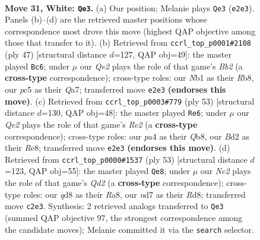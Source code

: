 \documentclass[11pt]{article}
\begin{document}
\clearpage

\begin{figure}[p]\centering
\begin{subfigure}{0.46\textwidth}\centering
\resizebox{\linewidth}{!}{%
\newchessgame
\chessboard[
  setfen={r2q1rk1/3n1pb1/3p1n2/1Ppb3p/p6P/P2B2P1/1PNBQ3/RN3RK1 w - c6 0 31},
  showmover=false,
  pgfstyle=straightmove, color=movearrow, markmove={e2-e3}
]}
\caption{}
\end{subfigure}\hfill
\begin{subfigure}{0.46\textwidth}\centering
\resizebox{\linewidth}{!}{%
\newchessgame
\chessboard[
  setfen={1rr2k1b/qb2pp1p/p5pP/4n3/8/1NN2P2/PPP1B1P1/1K1RQ2R b - - 8 24},
  showmover=false,
  pgfstyle=straightmove, color=movearrow, markmove={b7-c6}
]}
\caption{}
\end{subfigure}
\\[4pt]
\begin{subfigure}{0.46\textwidth}\centering
\resizebox{\linewidth}{!}{%
\newchessgame
\chessboard[
  setfen={1q2rbk1/1b1nrpp1/3p3p/1Pp5/4Pn2/2B2N1P/2QN1PP1/1R2RBK1 b - - 6 27},
  showmover=false,
  pgfstyle=straightmove, color=movearrow, markmove={e7-e6}
]}
\caption{}
\end{subfigure}\hfill
\begin{subfigure}{0.46\textwidth}\centering
\resizebox{\linewidth}{!}{%
\newchessgame
\chessboard[
  setfen={r2r2k1/3q1nb1/2p1bnp1/2B1p2p/p3P3/P1N3NP/2P1B1P1/1R2QRK1 b - - 9 27},
  showmover=false,
  pgfstyle=straightmove, color=movearrow, markmove={d7-e8}
]}
\caption{}
\end{subfigure}
\caption{\textbf{Move 31, White: \texttt{Qe3}.} (a) Our position; Melanie plays \texttt{Qe3} (\texttt{e2e3}). Panels (b)--(d) are the retrieved master positions whose correspondence most drove this move (highest QAP objective among those that transfer to it). (b) Retrieved from \texttt{ccrl\_top\_p0001\#2108} (ply 47) [structural distance $d$=127, QAP obj=49]: the master played \texttt{Bc6}; under $\mu$ our \emph{Qe2} plays the role of that game's \emph{Bb2} (a \textbf{cross-type} correspondence); cross-type roles: our \emph{N}b1 as their \emph{R}b8, our \emph{p}c5 as their \emph{Q}a7; transferred move \texttt{e2e3} \textbf{(endorses this move)}. (c) Retrieved from \texttt{ccrl\_top\_p0003\#779} (ply 53) [structural distance $d$=130, QAP obj=48]: the master played \texttt{Re6}; under $\mu$ our \emph{Qe2} plays the role of that game's \emph{Re2} (a \textbf{cross-type} correspondence); cross-type roles: our \emph{p}a4 as their \emph{Q}b8, our \emph{B}d2 as their \emph{R}e8; transferred move \texttt{e2e3} \textbf{(endorses this move)}. (d) Retrieved from \texttt{ccrl\_top\_p0000\#1537} (ply 53) [structural distance $d$=123, QAP obj=55]: the master played \texttt{Qe8}; under $\mu$ our \emph{Nc2} plays the role of that game's \emph{Qd2} (a \textbf{cross-type} correspondence); cross-type roles: our \emph{q}d8 as their \emph{R}a8, our \emph{n}d7 as their \emph{R}d8; transferred move \texttt{c2e3}. Synthesis: 2 retrieved analogs transferred to \texttt{Qe3} (summed QAP objective 97, the strongest correspondence among the candidate moves); Melanie committed it via the \texttt{search} selector.}
\label{fig:thought-m60}
\end{figure}
\end{document}
